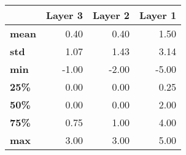 \begin{tabular}{lrrr}
\toprule
{} &  Layer 3 &  Layer 2 &  Layer 1 \\
\midrule
\textbf{mean} &     0.40 &     0.40 &     1.50 \\
\textbf{std } &     1.07 &     1.43 &     3.14 \\
\textbf{min } &    -1.00 &    -2.00 &    -5.00 \\
\textbf{25\% } &     0.00 &     0.00 &     0.25 \\
\textbf{50\% } &     0.00 &     0.00 &     2.00 \\
\textbf{75\% } &     0.75 &     1.00 &     4.00 \\
\textbf{max } &     3.00 &     3.00 &     5.00 \\
\bottomrule
\end{tabular}
